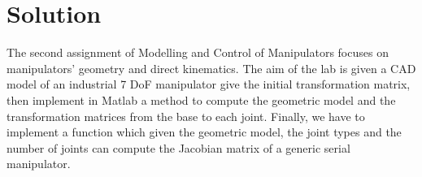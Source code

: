 \section{Solution} \label{P1}

The second assignment of Modelling and Control of Manipulators focuses on manipulators’ geometry and
direct kinematics. The aim of the lab is given a CAD model of an industrial 7 DoF manipulator give the initial transformation matrix, then implement in Matlab a method to compute the geometric model and the transformation matrices from the base to each joint. Finally, we have to implement a function which given the geometric model, the joint types and the number of joints can compute the Jacobian matrix of a generic serial manipulator.









